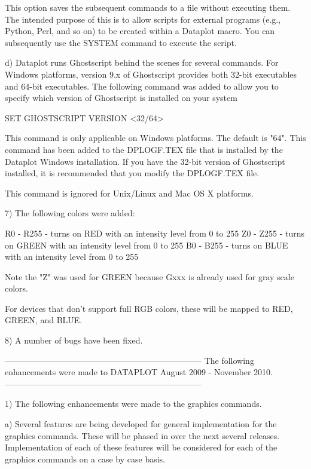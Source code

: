 {       This option saves the subsequent commands to a file
       without executing them.  The intended purpose of this
       is to allow scripts for external programs (e.g., Python,
       Perl, and so on) to be created within a Dataplot
       macro.  You can subsequently use the SYSTEM command to
       execute the script.

    d) Dataplot runs Ghostscript behind the scenes for several
       commands.  For Windows platforms, version 9.x of Ghostscript
       provides both 32-bit executables and 64-bit executables.  The
       following command was added to allow you to specify which
       version of Ghostscript is installed on your system

          SET GHOSTSCRIPT VERSION <32/64>

       This command is only applicable on Windows platforms.
       The default is "64".  This command has been added to the
       DPLOGF.TEX file that is installed by the Dataplot Windows
       installation.  If you have the 32-bit version of Ghostscript
       installed, it is recommended that you modify the DPLOGF.TEX
       file.

       This command is ignored for Unix/Linux and Mac OS X platforms.

 7) The following colors were added:

      R0 - R255  - turns on RED with an intensity level from 0
                   to 255
      Z0 - Z255  - turns on GREEN with an intensity level from 0
                   to 255
      B0 - B255  - turns on BLUE with an intensity level from 0
                   to 255

    Note the "Z" was used for GREEN because Gxxx is already used
    for gray scale colors.

    For devices that don't support full RGB colors, these will
    be mapped to RED, GREEN, and BLUE.

 8) A number of bugs have been fixed.

-----------------------------------------------------------------------
The following enhancements were made to DATAPLOT
August 2009 - November 2010.
-----------------------------------------------------------------------

 1) The following enhancements were made to the graphics commands.

    a) Several features are being developed for general implementation
       for the graphics commands.  These will be phased in over
       the next several releases.  Implementation of each of these
       features will be considered for each of the graphics commands
       on a case by case basis.

}
